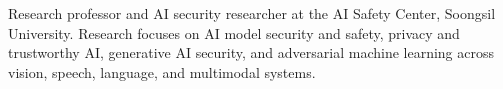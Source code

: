 
\begin{cvparagraph}
Research professor and AI security researcher at the AI Safety Center, Soongsil University. Research focuses on AI model security and safety, privacy and trustworthy AI, generative AI security, and adversarial machine learning across vision, speech, language, and multimodal systems.
\end{cvparagraph}
